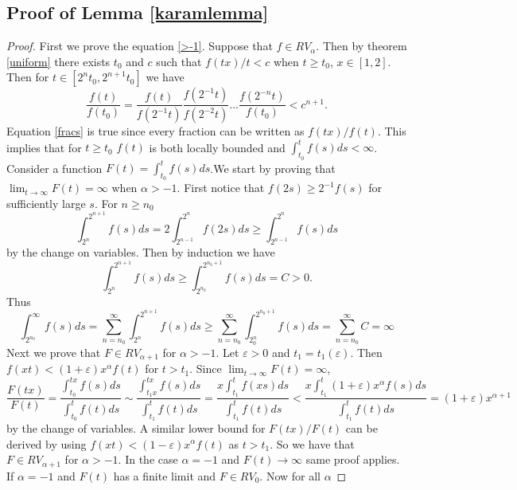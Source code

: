 \documentclass[english,12pt,a4paper,pdftex,sci,utf8]{aaltothesis} %
\begin{document}
\subsection{Proof of Lemma \ref{karamlemma}}

\begin{proof}
First we prove the equation \ref{>-1}. Suppose that $f \in RV_{\alpha}$. Then by theorem \ref{uniform} there exists $t_0$ and $c$ such that $f(tx)/t<c$ when $t \geq t_0$, $x \in [1,2]$. Then for $t \in [2^nt_0, 2^{n+1}t_0]$ we have
\begin{equation}
\frac{f(t)}{f(t_0)}=\frac{f(t)}{f(2^{-1}t)}\frac{f(2^{-1}t)}{f(2^{-2}t)} ... \frac{f(2^{-n}t)}{f(t_0)} < c^{n+1}.
\label{fracs}
\end{equation}
Equation \ref{fracs} is true since every fraction can be written as $f(tx)/f(t)$. This implies that for $t\geq t_0$ $f(t)$ is both locally bounded and $\int_{t_0}^{t}f(s)ds<\infty$. Consider a function $F(t) = \int_{t_0}^{t}f(s)ds$.We start by proving that $\lim_{t \rightarrow \infty} F(t) = \infty$ when $\alpha>-1$. First notice that $f(2s) \geq 2^{-1}f(s)$ for sufficiently large $s$. For $n\geq n_0$
\begin{equation}
\int_{2^n}^{2^{n+1}} f(s)ds = 2\int_{2^{n-1}}^{2^{n}} f(2s)ds \geq \int_{2^{n-1}}^{2^n} f(s)ds
\label{varchange}
\end{equation}
by the change on variables. Then by induction we have
\begin{equation}
\int_{2^n}^{2^{n+1}} f(s)ds \geq \int_{2^{n_0}}^{2^{n_0+1}} f(s)ds = C > 0.
\label{induction}
\end{equation}
Thus
\begin{equation}
\int_{2^{n_0}}^{\infty} f(s)ds = \sum_{n=n_0}^{\infty} \int_{2^n}^{2^{n+1}} f(s)ds \geq \sum_{n=n_0}^{\infty} \int_{2^n_0}^{2^{n_0+1}} f(s)ds = \sum_{n=n_0}^{\infty} C = \infty
\label{infinite}
\end{equation}
Next we prove that $F \in RV_{\alpha+1}$ for $\alpha>-1$. Let $\varepsilon>0$ and $t_1=t_1(\varepsilon)$. Then $f(xt)<(1+\varepsilon)x^{\alpha}f(t)$ for $t>t_1$. Since $\lim_{t \rightarrow \infty} F(t)=\infty$,
\begin{equation*}
\frac{F(tx)}{F(t)} = \frac{\int_{t_0}^{tx} f(s)ds}{\int_{t_0}^{t} f(t)ds} \sim \frac{\int_{t_1x}^{tx} f(s)ds}{\int_{t_1}^{t} f(t)ds}=\frac{x\int_{t_1}^{t} f(xs)ds}{\int_{t_1}^{t} f(t)ds} < \frac{x\int_{t_1}^{t}(1+\varepsilon)x^{\alpha} f(s)ds}{\int_{t_1}^{t} f(t)ds} = (1+ \varepsilon)x^{\alpha+1}
\end{equation*}
by the change of variables. A similar lower bound for $F(tx)/F(t)$ can be derived by using $f(xt)<(1-\varepsilon)x^{\alpha}f(t)$ as $t > t_1$. So we have that $F \in RV_{\alpha+1}$ for $\alpha>-1$. In the case $\alpha=-1$ and $F(t) \rightarrow \infty$ same proof applies. If $\alpha=-1$ and $F(t)$ has a finite limit and $F \in RV_0$. Now for all $\alpha$

\end{proof}
\end{document}
